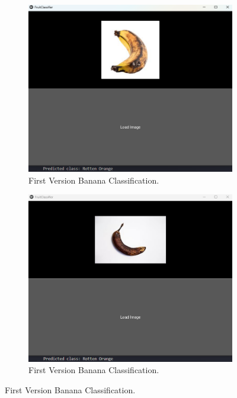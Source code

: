 \documentclass[conference]{IEEEtran}
\begin{document}
\begin{figure}[h]
\begin{subfigure}[b]{0.48\linewidth}
        \label{figFA}
    \end{subfigure}
    \hfill
    \begin{subfigure}[b]{0.48\linewidth}
        \centering
        \includegraphics[width=\linewidth]{1layer bananaR2.png}
        \caption{First Version Banana Classification.}
        \label{figFB}
    \end{subfigure}
    \hfill
    \begin{subfigure}[b]{0.48\linewidth}
        \centering
        \includegraphics[width=\linewidth]{1layer bananaR3.png}
        \caption{First Version Banana Classification.}

\end{subfigure}
\end{figure}
\end{document}
